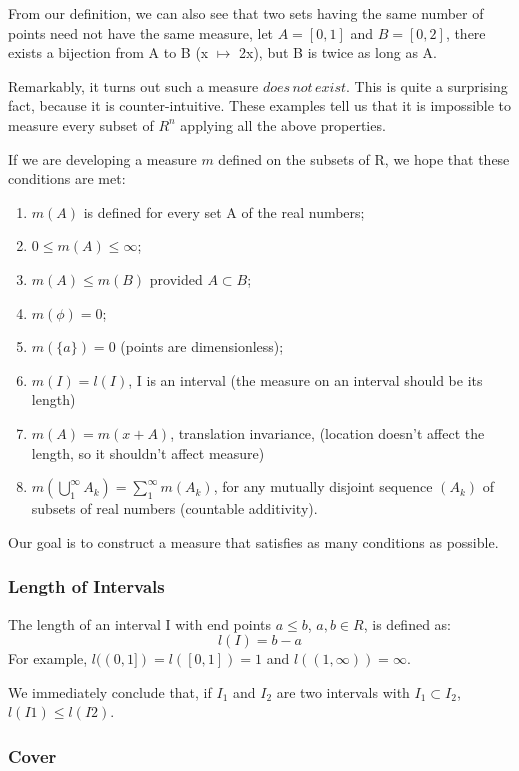 \documentclass{article}
\begin{document}
From our definition, we can also see that two sets having the same number of points need not have the same measure, let $A=[0,1]$ and $B=[0,2]$, there exists a bijection from A to B (x $\mapsto$ 2x), but B is twice as long as A.
 
 Remarkably, it turns out such a measure $does \, not \,exist$. This is quite a surprising fact, because it is counter-intuitive. These examples tell us that it is impossible to measure every subset of $R^n$ applying all the above properties. 
 
 If we are developing a measure $m$ defined on the subsets of R, we hope that these conditions are met:
 \begin{enumerate}
     \item $m(A)$ is defined for every set A of the real numbers;
     \item $0\leq m(A) \leq \infty$;
     \item $m(A) \leq m(B)$ provided $A \subset B$;
     \item $m(\phi) =0 $;
     \item $m(\{a\})=0$ (points are dimensionless);
     \item $m(I)=l(I)$, I is an interval (the measure on an interval should be its length)
     \item $m(A)=m(x+A)$, translation invariance, (location doesn't affect the length, so it shouldn't affect measure)
     \item $m(\bigcup_{1}^{\infty} {A_k}) = \sum_{1}^{\infty}m(A_k)$, for any mutually disjoint sequence $(A_k)$ of subsets of real numbers (countable additivity).
 \end{enumerate}
 Our goal is to construct a measure that satisfies as many conditions as possible.
 
 \subsubsection{Length of Intervals}
 
 The length of an interval I with end points $a\leq b$, $a,b \in R$, is defined as:
 $$l(I) = b-a$$
 For example, $l((0,1])=l([0,1])=1$ and $l((1,\infty))=\infty$.
 
 We immediately conclude that, if $I_1$ and $I_2$ are two intervals with $I_1 \subset I_2$, $l(I1) \leq l(I2)$.
 
 \subsubsection{Cover}
 
\end{document}
